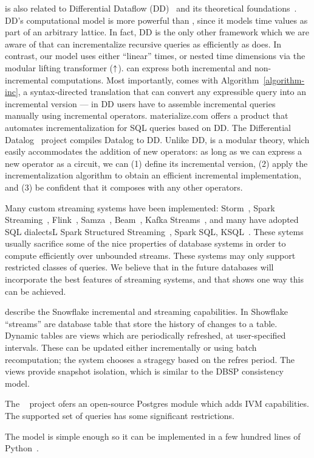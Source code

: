 \dbsp is also related to Differential Dataflow
(DD)~\cite{mcsherry-cidr13,murray-sosp13,chothia-vldb16} and its
theoretical foundations~\cite{abadi-fossacs15}.  DD's computational
model is more powerful than \dbsp, since it models time values as part
of an arbitrary lattice.  In fact, DD is the only other framework
which we are aware of that can incrementalize recursive queries as
efficiently as \dbsp does.  In contrast, our model uses either
``linear'' times, or nested time dimensions via the modular lifting
transformer (${\uparrow}$).  \dbsp can express both incremental and
non-incremental computations.  Most importantly, \dbsp comes with
Algorithm~\ref{algorithm-inc}, a syntax-directed translation that can
convert any expressible query into an incremental version --- in DD
users have to assemble incremental queries manually using incremental
operators.  materialize.com offers a product that automates
incrementalization for SQL queries based on DD.  The Differential
Datalog~\cite{ryzhyk-datalog19} project compiles Datalog to DD.
Unlike DD, \dbsp is a modular theory, which easily accommodates the
addition of new operators: as long as we can express a new operator as
a \dbsp circuit, we can (1) define its incremental version, (2) apply
the incrementalization algorithm to obtain an efficient incremental
implementation, and (3) be confident that it composes with any other
operators.

Many custom streaming systems have been implemented:
Storm~\cite{toshnival-sigmod14}, Spark
Streaming~\cite{zaharia-sosp13}, Flink~\cite{carbone-ieee15},
Samza~\cite{noghabi-vldb17}, Beam~\cite{akidau-vldb15}, Kafka
Streams~\cite{wang-sigmod21}, and many have adopted SQL dialectsL
Spark Structured Streaming~\cite{armbrust-sigmod18}, Spark SQL,
KSQL~\cite{jafarpour-edbt19}.  These sytems usually sacrifice some of
the nice properties of database systems in order to compute
efficiently over unbounded streams.  These systems may only support
restricted classes of queries.  We believe that in the future
databases will incorporate the best features of streaming systems, and
that \dbsp shows one way this can be achieved.

\cite{akidau-amd23,akidau-debs24} describe the Snowflake incremental
and streaming capabilities.  In Showflake ``streams'' are database
table that store the history of changes to a table.  Dynamic tables
are views which are periodically refreshed, at user-specified
intervals.  These can be updated either incrementally or using batch
recomputation; the system chooses a stragegy based on the refres
period.  The views provide snapshot isolation, which is similar to the
DBSP consistency model.

The ~\cite{pgivm} project ofers an open-source Postgres
module which adds IVM capabilities.  The supported set of queries has
some significant restrictions.

The \dbsp model is simple enough so it can be implemented in a few
hundred lines of Python~\cite{dbsp-python}.
